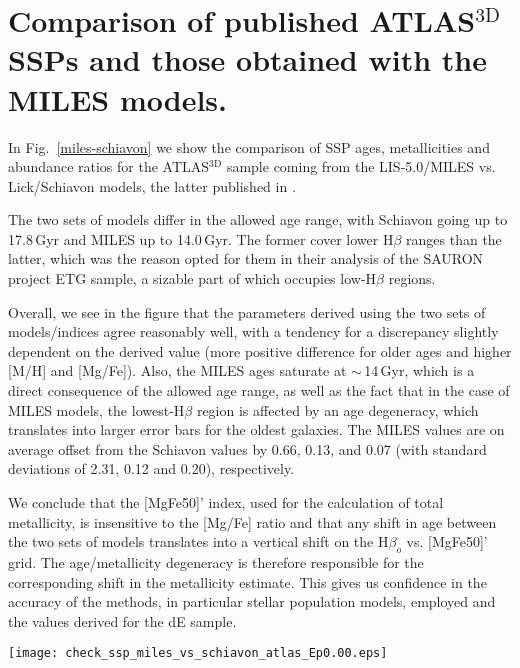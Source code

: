 \documentclass[useAMS,usenatbib]{mn2e}
\newcommand{\hb}{H$\beta$}
\newcommand{\hbo}{H$\beta_o$}
\newcommand{\atlas}{ATLAS$^{\mathrm{3D}}$}
\begin{document}
\section{Comparison of published {\atlas} SSPs and those obtained with the MILES models.}
\label{appendix-comparison}

In Fig.~\ref{miles-schiavon} we show the comparison of SSP ages, metallicities and abundance ratios for the {\atlas} sample coming from the LIS-5.0/MILES vs. Lick/Schiavon models, the latter published in \cite{mcdermid:2015}. 

The two sets of models differ in the allowed age range, with Schiavon going up to 17.8\,Gyr and MILES up to 14.0\,Gyr. The former cover lower {\hb} ranges than the latter, which was the reason \cite{kuntschner:2010} opted for them in their analysis of the SAURON project ETG sample, a sizable part of which occupies low-{\hb} regions. 

Overall, we see in the figure that the parameters derived using the two sets of models/indices agree reasonably well, with a tendency for a discrepancy slightly dependent on the derived value (more positive difference for older ages and higher [M/H] and [Mg/Fe]). Also, the MILES ages saturate at $\sim$\,14\,Gyr, which is a direct consequence of the allowed age range, as well as the fact that in the case of MILES models, the lowest-{\hb} region is affected by an age degeneracy, which translates into larger error bars for the oldest galaxies. The MILES values are on average offset from the Schiavon values by 0.66, 0.13, and 0.07 (with standard deviations of 2.31, 0.12 and 0.20), respectively. 

We conclude that the [MgFe50]' index, used for the calculation of total metallicity, is insensitive to the [Mg/Fe] ratio and that any shift in age between the two sets of models translates into a vertical shift on the {\hbo} vs. [MgFe50]' grid. The age/metallicity degeneracy is therefore responsible for the corresponding  shift in the metallicity estimate. This gives us confidence in the accuracy of the methods, in particular stellar population models, employed and the values derived for the dE sample. 

\begin{figure*}
\centering
\texttt{[image: check\_ssp\_miles\_vs\_schiavon\_atlas\_Ep0.00.eps]}
\caption{Comparison of the {\atlas} SSP parameters derived with the use of MILES models of \protect\cite{vazdekis:2015} using \protect\cite{mcdermid:2015} line strengths transformed into the LIS-5.0 system vs. the published SSP values of \protect\cite{mcdermid:2015}, measured using a customized version of Schiavon models and based on the Lick system line strengths. The bottom row includes best straight-line fits (solid black lines) to the shown relations, together with the lines' slope values (quoted in the upper left corners of the respective panels).}
\label{miles-schiavon}  
\end{figure*} 
\end{document}
